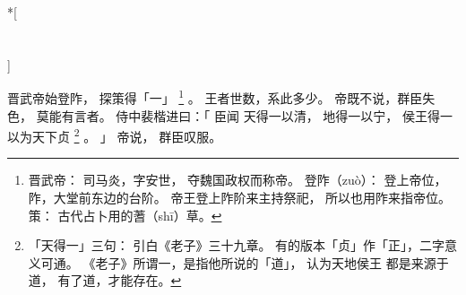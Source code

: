 
\switchcolumn[0]*[\section{}]

晋武帝始登阼，
探策得「一」%
\footnote{%
    晋武帝：
        司马炎，字安世，
        夺魏国政权而称帝。
    登阼（zuò）：
        登上帝位，
        阼，大堂前东边的台阶。
        帝王登上阼阶来主持祭祀，
        所以也用阼来指帝位。
    策：
        古代占卜用的蓍（shī）草。
}%
。
王者世数，系此多少。
帝既不说，群臣失色，
莫能有言者。
侍中裴楷进曰：「
    臣闻
    天得一以清，
    地得一以宁，
    侯王得一
    以为天下贞%
    \footnote{%
        「天得一」三句：
            引白《老子》三十九章。
            有的版本「贞」作「正」，二字意义可通。
            《老子》所谓一，是指他所说的「道」，
            认为天地侯王
            都是来源于道，
            有了道，才能存在。
    }%
    。
」
帝说，
群臣叹服。

\switchcolumn



